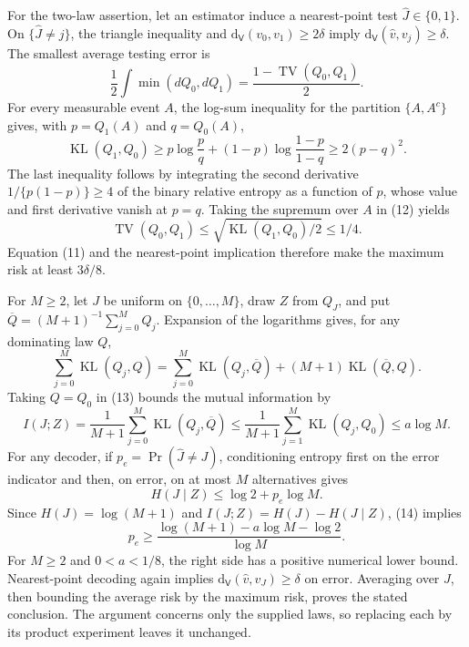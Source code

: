 For the two-law assertion, let an estimator induce a nearest-point test \(\widehat J\in\{0,1\}\). On \(\{\widehat J\ne j\}\), the triangle inequality and \(\mathrm d_{\mathsf V}(v_0,v_1)\ge2\delta\) imply \(\mathrm d_{\mathsf V}(\widehat v,v_j)\ge\delta\). The smallest average testing error is
\[
 \frac12\int \min(dQ_0,dQ_1)=\frac{1-\operatorname{TV}(Q_0,Q_1)}2. \tag{11}
\]
For every measurable event \(A\), the log-sum inequality for the partition \(\{A,A^c\}\) gives, with \(p=Q_1(A)\) and \(q=Q_0(A)\),
\[
 \operatorname{KL}(Q_1,Q_0)
 \ge p\log\frac pq+(1-p)\log\frac{1-p}{1-q}
 \ge2(p-q)^2. \tag{12}
\]
The last inequality follows by integrating the second derivative \(1/\{p(1-p)\}\ge4\) of the binary relative entropy as a function of \(p\), whose value and first derivative vanish at \(p=q\). Taking the supremum over \(A\) in (12) yields
\[
 \operatorname{TV}(Q_0,Q_1)\le\sqrt{\operatorname{KL}(Q_1,Q_0)/2}\le1/4.
\]
Equation (11) and the nearest-point implication therefore make the maximum risk at least \(3\delta/8\).

For \(M\ge2\), let \(J\) be uniform on \(\{0,\ldots,M\}\), draw \(Z\) from \(Q_J\), and put \(\overline Q=(M+1)^{-1}\sum_{j=0}^M Q_j\). Expansion of the logarithms gives, for any dominating law \(Q\),
\[
 \sum_{j=0}^M\operatorname{KL}(Q_j,Q)
 =\sum_{j=0}^M\operatorname{KL}(Q_j,\overline Q)
 +(M+1)\operatorname{KL}(\overline Q,Q). \tag{13}
\]
Taking \(Q=Q_0\) in (13) bounds the mutual information by
\[
 I(J;Z)=\frac1{M+1}\sum_{j=0}^M\operatorname{KL}(Q_j,\overline Q)
 \le\frac1{M+1}\sum_{j=1}^M\operatorname{KL}(Q_j,Q_0)
 \le a\log M. \tag{14}
\]
For any decoder, if \(p_e=\Pr(\widehat J\ne J)\), conditioning entropy first on the error indicator and then, on error, on at most \(M\) alternatives gives
\[
 H(J\mid Z)\le\log2+p_e\log M.
\]
Since \(H(J)=\log(M+1)\) and \(I(J;Z)=H(J)-H(J\mid Z)\), (14) implies
\[
 p_e\ge
 \frac{\log(M+1)-a\log M-\log2}{\log M}. \tag{15}
\]
For \(M\ge2\) and \(0<a<1/8\), the right side has a positive numerical lower bound. Nearest-point decoding again implies \(\mathrm d_{\mathsf V}(\widehat v,v_J)\ge\delta\) on error. Averaging over \(J\), then bounding the average risk by the maximum risk, proves the stated conclusion. The argument concerns only the supplied laws, so replacing each by its product experiment leaves it unchanged.